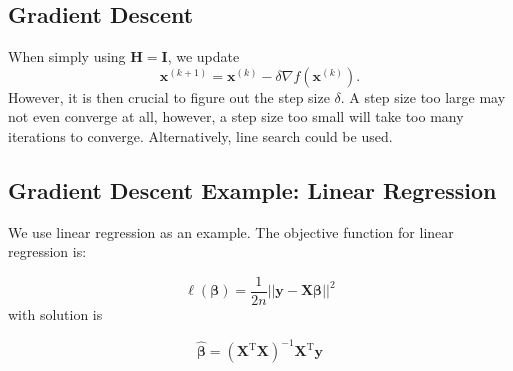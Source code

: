 \documentclass[
]{book}
\theoremstyle{definition}
\theoremstyle{definition}
\theoremstyle{definition}
\theoremstyle{definition}
\theoremstyle{remark}
\begin{document}
\hypertarget{gradient-descent}{%
\subsection{Gradient Descent}\label{gradient-descent}}

When simply using \(\mathbf{H}= \mathbf{I}\), we update
\[\mathbf{x}^{(k+1)} = \mathbf{x}^{(k)} - \delta \nabla f(\mathbf{x}^{(k)}).\]
However, it is then crucial to figure out the step size \(\delta\). A step size too large may not even converge at all, however, a step size too small will take too many iterations to converge. Alternatively, line search could be used.

\hypertarget{gradient-descent-example-linear-regression}{%
\subsection{Gradient Descent Example: Linear Regression}\label{gradient-descent-example-linear-regression}}

We use linear regression as an example. The objective function for linear regression is:

\[ \ell(\boldsymbol \beta) = \frac{1}{2n}||\mathbf{y} - \mathbf{X} \boldsymbol \beta ||^2 \]
with solution is

\[\widehat{\boldsymbol \beta} = \left(\mathbf{X}^\text{T}\mathbf{X}\right)^{-1} \mathbf{X}^\text{T} \mathbf{y} \]
\end{document}

